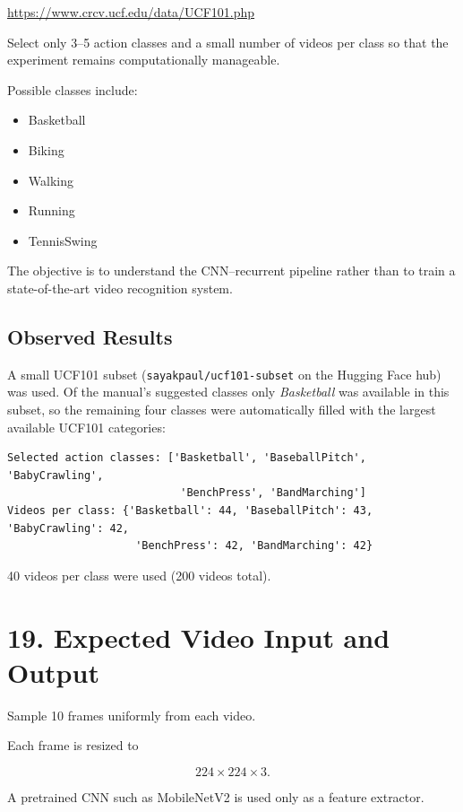 \documentclass[10pt]{article}
\begin{document}
\url{https://www.crcv.ucf.edu/data/UCF101.php}

Select only 3--5 action classes and a small number of videos per class so that
the experiment remains computationally manageable.

Possible classes include:

\begin{itemize}
\item Basketball
\item Biking
\item Walking
\item Running
\item TennisSwing
\end{itemize}

The objective is to understand the CNN--recurrent pipeline rather than to
train a state-of-the-art video recognition system.

\subsection*{Observed Results}

A small UCF101 subset (\texttt{sayakpaul/ucf101-subset} on the Hugging Face
hub) was used. Of the manual's suggested classes only \emph{Basketball} was
available in this subset, so the remaining four classes were automatically
filled with the largest available UCF101 categories:

\begin{verbatim}
Selected action classes: ['Basketball', 'BaseballPitch', 'BabyCrawling',
                           'BenchPress', 'BandMarching']
Videos per class: {'Basketball': 44, 'BaseballPitch': 43, 'BabyCrawling': 42,
                    'BenchPress': 42, 'BandMarching': 42}
\end{verbatim}

40 videos per class were used (200 videos total).

\section*{19. Expected Video Input and Output}

Sample 10 frames uniformly from each video.

Each frame is resized to

\[
224\times224\times3.
\]

A pretrained CNN such as MobileNetV2 is used only as a feature extractor.
\end{document}
